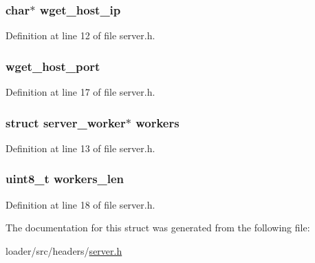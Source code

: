 \subsubsection[{\texorpdfstring{wget\+\_\+host\+\_\+ip}{wget_host_ip}}]{\setlength{\rightskip}{0pt plus 5cm}char$\ast$ wget\+\_\+host\+\_\+ip}\hypertarget{structserver_ad37424a0d9627326449581b932597c1d}{}\label{structserver_ad37424a0d9627326449581b932597c1d}


Definition at line 12 of file server.\+h.

\subsubsection[{\texorpdfstring{wget\+\_\+host\+\_\+port}{wget_host_port}}]{ wget\+\_\+host\+\_\+port}\hypertarget{structserver_a485e81def97a840a7f0ee2635e46bf07}{}\label{structserver_a485e81def97a840a7f0ee2635e46bf07}


Definition at line 17 of file server.\+h.

\subsubsection[{\texorpdfstring{workers}{workers}}]{\setlength{\rightskip}{0pt plus 5cm}struct {\bf server\+\_\+worker}$\ast$ workers}\hypertarget{structserver_a3dd96237dccb83d96d674007e2cef801}{}\label{structserver_a3dd96237dccb83d96d674007e2cef801}


Definition at line 13 of file server.\+h.

\subsubsection[{\texorpdfstring{workers\+\_\+len}{workers_len}}]{\setlength{\rightskip}{0pt plus 5cm}uint8\+\_\+t workers\+\_\+len}\hypertarget{structserver_ab76231f9ee81a6400b7ac02155895274}{}\label{structserver_ab76231f9ee81a6400b7ac02155895274}


Definition at line 18 of file server.\+h.



The documentation for this struct was generated from the following file\+:\begin{DoxyCompactItemize}
\item 
loader/src/headers/\hyperlink{server_8h}{server.\+h}\end{DoxyCompactItemize}
